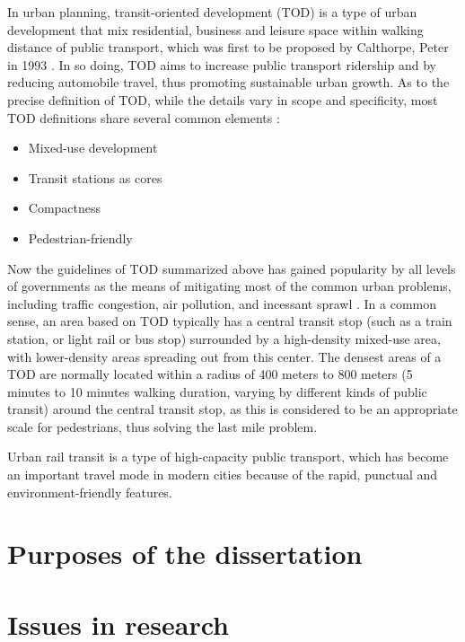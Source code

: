In urban planning, transit-oriented development (TOD) is a type of urban development that mix residential, business and leisure space within walking distance of public transport, which was first to be proposed by Calthorpe, Peter in 1993 \cite{calthorpe1993next}. In so doing, TOD aims to increase public transport ridership and by reducing automobile travel, thus promoting sustainable urban growth. As to the precise definition of TOD, while the details vary in scope and specificity, most TOD definitions share several common elements \cite{boarnet1997story,bernick1997transit,megally2001california,cervero2004transit}:

\begin{itemize}
	\item Mixed-use development
	\item Transit stations as cores
	\item Compactness
	\item Pedestrian-friendly
\end{itemize}

% 
Now the guidelines of TOD summarized above has gained popularity by all levels of governments as the means of mitigating most of the common urban problems, including traffic congestion, air pollution, and incessant sprawl \cite{cervero2002transit}. In a common sense, an area based on TOD typically has a central transit stop (such as a train station, or light rail or bus stop) surrounded by a high-density mixed-use area, with lower-density areas spreading out from this center. The densest areas of a TOD are normally located within a radius of 400 meters to 800 meters (5 minutes to 10 minutes walking duration, varying by different kinds of public transit) around the central transit stop, as this is considered to be an appropriate scale for pedestrians, thus solving the last mile problem. 

Urban rail transit is a type of high-capacity public transport, which has become an important travel mode in modern cities because of the rapid, punctual and environment-friendly features. 




% 

\section{Purposes of the dissertation}

\section{Issues in research}



